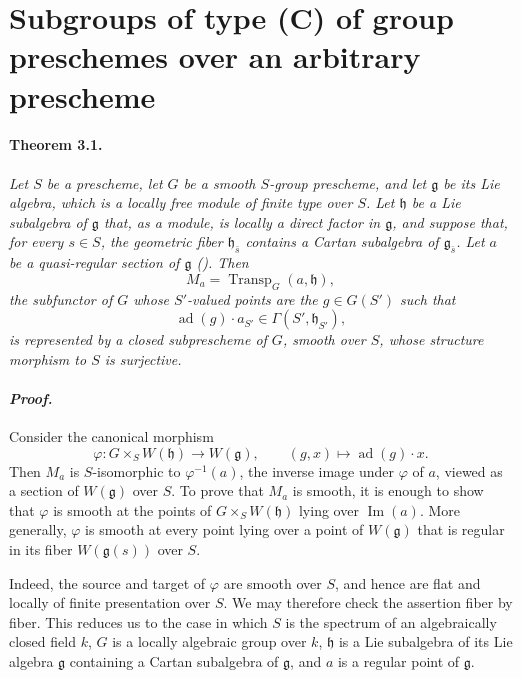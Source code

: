 
\section{Subgroups of type \textup{(C)} of group preschemes over an
arbitrary prescheme}

\paragraph{\textbf{Theorem 3.1.}}
{\itshape Let \(S\) be a prescheme, let \(G\) be a smooth
\(S\)-group prescheme, and let \(\mathfrak g\) be its Lie algebra,
which is a locally free module of finite type over \(S\). Let
\(\mathfrak h\) be a Lie subalgebra of \(\mathfrak g\) that, as a
module, is locally a direct factor in \(\mathfrak g\), and suppose
that, for every \(s\in S\), the geometric fiber
\(\mathfrak h_{\bar s}\) contains a Cartan subalgebra of
\(\mathfrak g_{\bar s}\). Let \(a\) be a quasi-regular section of
\(\mathfrak g\) \textup{()}. Then
\[
  M_a=\operatorname{Transp}_G(a,\mathfrak h),
\]
the subfunctor of \(G\) whose \(S'\)-valued points are the
\(g\in G(S')\) such that
\[
  \operatorname{ad}(g)\cdot a_{S'}
    \in\Gamma(S',\mathfrak h_{S'}),
\]
is represented by a closed subprescheme of \(G\), smooth over
\(S\), whose structure morphism to \(S\) is surjective.}

\paragraph{\textit{Proof.}}
Consider the canonical morphism
\[
  \varphi\colon G\times_S W(\mathfrak h)\longrightarrow
  W(\mathfrak g),
  \qquad
  (g,x)\longmapsto\operatorname{ad}(g)\cdot x.
\]
Then \(M_a\) is \(S\)-isomorphic to \(\varphi^{-1}(a)\), the inverse
image under \(\varphi\) of \(a\), viewed as a section of
\(W(\mathfrak g)\) over \(S\). To prove that \(M_a\) is smooth, it
is enough to show that \(\varphi\) is smooth at the points of
\(G\times_S W(\mathfrak h)\) lying over \(\operatorname{Im}(a)\).
More generally, \(\varphi\) is smooth at every point lying over a
point of \(W(\mathfrak g)\) that is regular in its fiber
\(W(\mathfrak g(s))\) over \(S\).

Indeed, the source and target of \(\varphi\) are smooth over \(S\),
and hence are flat and locally of finite presentation over \(S\).
We may therefore check the assertion fiber by fiber. This reduces
us to the case in which \(S\) is the spectrum of an algebraically
closed field \(k\), \(G\) is a locally algebraic group over \(k\),
\(\mathfrak h\) is a Lie subalgebra of its Lie algebra
\(\mathfrak g\) containing a Cartan subalgebra of \(\mathfrak g\),
and \(a\) is a regular point of \(\mathfrak g\).

